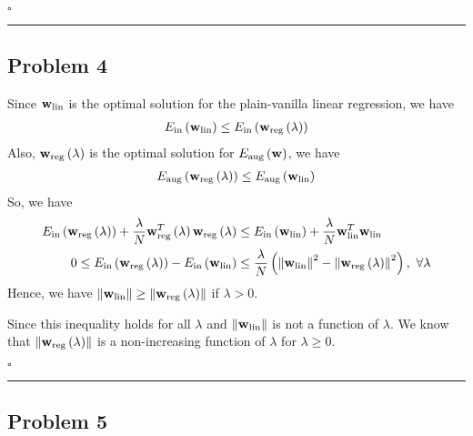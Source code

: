 \documentclass[12pt]{article}
\newcommand*{\QEDB}{\hfill\ensuremath{\square}}
\newcommand{\ParTh}[1]{\left(#1\right)}
\newcommand{\BF}[1]{{\bf#1}}
\newcommand{\VecAbsVal}[1]{\left\|#1\right\|}
\newcommand{\horrule}[1]{\rule{\linewidth}{#1}}
\begin{document}
\QEDB

\horrule{0.5pt}

\subsection*{Problem 4}

Since $\BF{w}_{\text{lin}}$ is the optimal solution for the plain-vanilla linear regression, we have
\begin{align}
E_{\text{in}}\ParTh{\BF{w}_{\text{lin}}}\leq E_{\text{in}}\ParTh{\BF{w}_{\text{reg}}\ParTh{\lambda}}
\end{align}
Also, $\BF{w}_{\text{reg}}\ParTh{\lambda}$ is the optimal solution for $E_{\text{aug}}\ParTh{\BF{w}}$, we have
\begin{align}
E_{\text{aug}}\ParTh{\BF{w}_{\text{reg}}\ParTh{\lambda}}\leq E_{\text{aug}}\ParTh{\BF{w}_{\text{lin}}}
\end{align}
So, we have
\begin{align}
E_{\text{in}}\ParTh{\BF{w}_{\text{reg}}\ParTh{\lambda}}+\dfrac{\lambda}{N}\BF{w}^T_{\text{reg}}\ParTh{\lambda}\BF{w}_{\text{reg}}\ParTh{\lambda}&\leq E_{\text{in}}\ParTh{\BF{w}_{\text{lin}}}+\dfrac{\lambda}{N}\BF{w}^T_{\text{lin}}\BF{w}_{\text{lin}}\\
0\leq E_{\text{in}}\ParTh{\BF{w}_{\text{reg}}\ParTh{\lambda}}-E_{\text{in}}\ParTh{\BF{w}_{\text{lin}}}&\leq \dfrac{\lambda}{N}\ParTh{\VecAbsVal{\BF{w}_{\text{lin}}}^2-\VecAbsVal{\BF{w}_{\text{reg}}\ParTh{\lambda}}^2},~\forall\lambda
\end{align}
Hence, we have $\VecAbsVal{\BF{w}_{\text{lin}}}\geq\VecAbsVal{\BF{w}_{\text{reg}}\ParTh{\lambda}}$ if $\lambda>0$.

Since this inequality holds for all $\lambda$ and $\VecAbsVal{\BF{w}_{\text{lin}}}$ is not a function of $\lambda$. We know that $\VecAbsVal{\BF{w}_{\text{reg}}\ParTh{\lambda}}$ is a non-increasing function of $\lambda$ for $\lambda\geq0$.

\QEDB

\horrule{0.5pt}

\subsection*{Problem 5}
\end{document}
